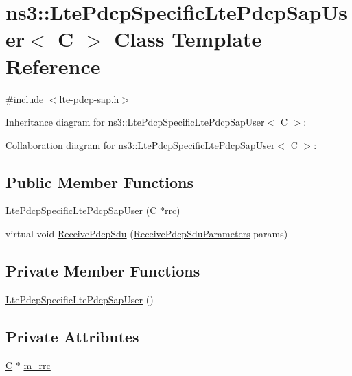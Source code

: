 \hypertarget{classns3_1_1LtePdcpSpecificLtePdcpSapUser}{}\section{ns3\+:\+:Lte\+Pdcp\+Specific\+Lte\+Pdcp\+Sap\+User$<$ C $>$ Class Template Reference}
\label{classns3_1_1LtePdcpSpecificLtePdcpSapUser}


{\ttfamily \#include $<$lte-\/pdcp-\/sap.\+h$>$}



Inheritance diagram for ns3\+:\+:Lte\+Pdcp\+Specific\+Lte\+Pdcp\+Sap\+User$<$ C $>$\+:


Collaboration diagram for ns3\+:\+:Lte\+Pdcp\+Specific\+Lte\+Pdcp\+Sap\+User$<$ C $>$\+:
\subsection*{Public Member Functions}
\begin{DoxyCompactItemize}
\item 
\hyperlink{classns3_1_1LtePdcpSpecificLtePdcpSapUser_a8026ee04f6b2cffa6160740728c4da4f}{Lte\+Pdcp\+Specific\+Lte\+Pdcp\+Sap\+User} (\hyperlink{loss__COST231__small__cities__urban_8m_aaa53ca0b650dfd85c4f59fa156f7a2cc}{C} $\ast$rrc)
\item 
virtual void \hyperlink{classns3_1_1LtePdcpSpecificLtePdcpSapUser_a085178f3177b6fee4d9cc8ceeb02714e}{Receive\+Pdcp\+Sdu} (\hyperlink{structns3_1_1LtePdcpSapUser_1_1ReceivePdcpSduParameters}{Receive\+Pdcp\+Sdu\+Parameters} params)
\end{DoxyCompactItemize}
\subsection*{Private Member Functions}
\begin{DoxyCompactItemize}
\item 
\hyperlink{classns3_1_1LtePdcpSpecificLtePdcpSapUser_ac2db7a4218cc2c50277212c4d7c9e739}{Lte\+Pdcp\+Specific\+Lte\+Pdcp\+Sap\+User} ()
\end{DoxyCompactItemize}
\subsection*{Private Attributes}
\begin{DoxyCompactItemize}
\item 
\hyperlink{loss__COST231__small__cities__urban_8m_aaa53ca0b650dfd85c4f59fa156f7a2cc}{C} $\ast$ \hyperlink{classns3_1_1LtePdcpSpecificLtePdcpSapUser_a50ced7b58fdf4d695db63332ae85dbc0}{m\+\_\+rrc}
\end{DoxyCompactItemize}


